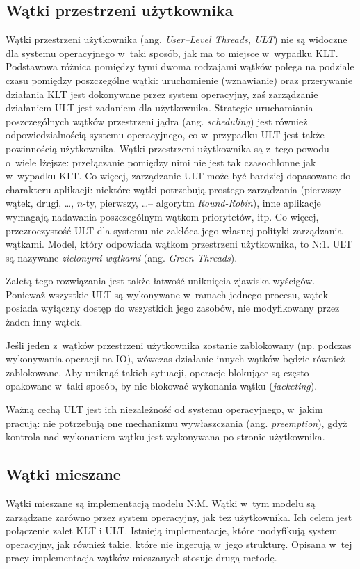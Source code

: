 \documentclass{mwart}
\begin{document}
\subsection{Wątki przestrzeni użytkownika}
%
\indent
	Wątki przestrzeni użytkownika (ang. \emph{User--Level Threads, ULT}) nie są widoczne dla systemu operacyjnego w~taki sposób,
	jak ma to miejsce w~wypadku KLT. Podstawowa różnica pomiędzy tymi dwoma rodzajami wątków polega na podziale czasu pomiędzy
	poszczególne wątki: uruchomienie (wznawianie) oraz przerywanie działania KLT jest dokonywane przez system operacyjny, zaś 
	zarządzanie działaniem ULT jest zadaniem dla użytkownika. Strategie uruchamiania poszczególnych wątków przestrzeni jądra
	(ang. \emph{scheduling}) jest również odpowiedzialnością systemu operacyjnego, co w~przypadku ULT jest także powinnością 
	użytkownika. Wątki przestrzeni użytkownika są z~tego powodu o~wiele lżejsze: przełączanie pomiędzy nimi nie jest tak czasochłonne
	jak w~wypadku KLT. Co więcej, zarządzanie ULT może być bardziej dopasowane do charakteru aplikacji: niektóre wątki potrzebują
	prostego zarządzania (pierwszy wątek, drugi, \ldots, $n$-ty, pierwszy, \ldots -- algorytm \emph{Round-Robin}),
	inne aplikacje wymagają nadawania poszczególnym wątkom priorytetów, itp. Co więcej, przezroczystość ULT dla systemu nie zakłóca
	jego własnej polityki zarządzania wątkami. Model, który odpowiada wątkom przestrzeni użytkownika, to N:1.
	ULT są nazywane \emph{zielonymi wątkami} (ang. \emph{Green Threads}).
\par
%
\indent
	Zaletą tego rozwiązania jest także łatwość uniknięcia zjawiska wyścigów. Ponieważ wszystkie ULT są wykonywane
	w~ramach jednego procesu, wątek posiada wyłączny dostęp do wszystkich jego zasobów,
	nie modyfikowany przez żaden inny wątek.
\par
%
\indent
	Jeśli jeden z~wątków przestrzeni
	użytkownika zostanie zablokowany (np. podczas wykonywania operacji na IO), wówczas działanie innych wątków będzie również zablokowane.
	Aby uniknąć takich sytuacji, operacje blokujące są często opakowane w~taki sposób, by nie blokować wykonania wątku (\emph{jacketing}).
\par
%
\indent
	Ważną cechą ULT jest ich niezależność od systemu operacyjnego, w~jakim pracują: nie potrzebują one mechanizmu wywłaszczania
	(ang. \emph{preemption}), gdyż kontrola nad wykonaniem wątku jest wykonywana po stronie użytkownika.
\par
%
\subsection{Wątki mieszane}
%
\indent
	Wątki mieszane są implementacją modelu N:M. Wątki w~tym modelu są zarządzane zarówno 
	przez system operacyjny, jak też użytkownika. Ich celem jest połączenie zalet KLT i ULT. Istnieją implementacje, które
	modyfikują system operacyjny, jak również takie, które nie ingerują w~jego strukturę. Opisana w~tej pracy implementacja
	wątków mieszanych stosuje drugą metodę.
\par
\end{document}
